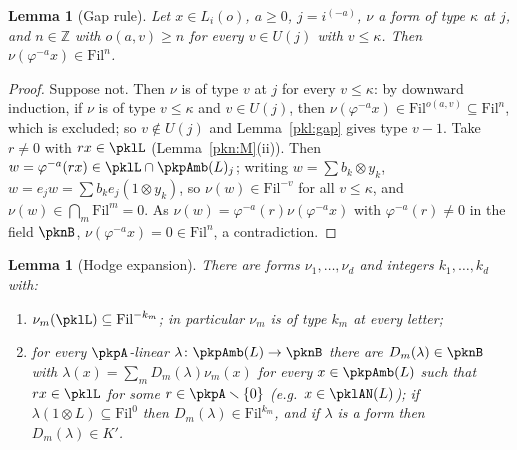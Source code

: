 \documentclass[10pt]{amsart}
\newtheorem{lemma}[theorem]{Lemma}
\theoremstyle{definition}
\theoremstyle{remark}
\newcommand{\Z}{\mathbb Z}
\begin{document}
\begin{lemma}[Gap rule]\label{pkl:gap-rule}
Let $x\in L_i(o)$, $a\ge0$, $j=i^{(-a)}$, $\nu$ a form of type $\kappa$ at $j$, and $n\in\Z$ with
$o(a,v)\ge n$ for every $v\in U(j)$ with $v\le\kappa$. Then $\nu(\varphi^{-a}x)\in\mathrm{Fil}^n$.
\end{lemma}

\begin{proof}
Suppose not. Then $\nu$ is of type $v$ at $j$ for every $v\le\kappa$: by downward induction, if $\nu$ is of type
$v\le\kappa$ and $v\in U(j)$, then $\nu(\varphi^{-a}x)\in\mathrm{Fil}^{o(a,v)}\subseteq\mathrm{Fil}^n$, which is
excluded; so $v\notin U(j)$ and Lemma~\ref{pkl:gap} gives type $v-1$. Take $r\ne0$ with $rx\in\pklL$
(Lemma~\ref{pkn:M}(ii)). Then $w=\varphi^{-a}(rx)\in\pklL\cap\pkpAmb(L)_j$; writing $w=\sum b_k\otimes y_k$,
$w=e_jw=\sum b_ke_j(1\otimes y_k)$, so $\nu(w)\in\mathrm{Fil}^{-v}$ for all $v\le\kappa$, and $\nu(w)\in
\bigcap_m\mathrm{Fil}^m=0$. As $\nu(w)=\varphi^{-a}(r)\nu(\varphi^{-a}x)$ with $\varphi^{-a}(r)\ne0$ in the field
$\pknB$, $\nu(\varphi^{-a}x)=0\in\mathrm{Fil}^n$, a contradiction.
\end{proof}

\begin{lemma}[Hodge expansion]\label{pkl:expand}
There are forms $\nu_1,\dots,\nu_d$ and integers $k_1,\dots,k_d$ with:
\begin{enumerate}
\item[(i)] $\nu_m(\pklL)\subseteq\mathrm{Fil}^{-k_m}$; in particular $\nu_m$ is of type $k_m$ at every letter;
\item[(ii)] for every $\pkpA$-linear $\lambda\colon\pkpAmb(L)\to\pknB$ there are $D_m(\lambda)\in\pknB$ with
$\lambda(x)=\sum_mD_m(\lambda)\nu_m(x)$ for every $x\in\pkpAmb(L)$ such that $rx\in\pklL$ for some
$r\in\pkpA\smallsetminus\{0\}$ (e.g.\ $x\in\pklAN(L)$); if $\lambda(1\otimes L)\subseteq\mathrm{Fil}^0$ then
$D_m(\lambda)\in\mathrm{Fil}^{k_m}$, and if $\lambda$ is a form then $D_m(\lambda)\in K'$.
\end{enumerate}
\end{lemma}
\end{document}
